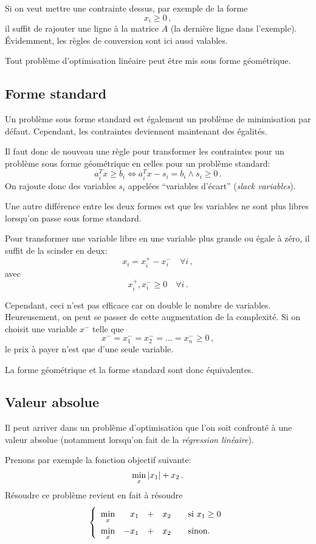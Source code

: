 	Si on veut mettre une contrainte dessus, par exemple de la forme
	\[
	x_i \ge 0\,,
	\]
	il suffit de rajouter une ligne à la matrice $A$
	(la dernière ligne dans l'exemple).
	Évidemment, les règles de conversion sont ici aussi valables.

	Tout problème d'optimisation linéaire
	peut être mis sous forme géométrique.

\subsection{Forme standard}

	Un problème sous forme standard est également
	un problème de minimisation par défaut.
	Cependant, les contraintes deviennent maintenant des égalités.

	Il faut donc de nouveau une règle
	pour transformer les contraintes
	pour un problème sous forme géométrique
	en celles pour un problème standard:
	\[
	a_i^T x \ge b_i \iff a_i^T x - s_i = b_i \land s_i \ge 0\,.
	\]
	On rajoute donc des variables $s_i$ appelées
	``variables d'écart'' (\emph{slack variables}).

	Une autre différence entre les deux formes est
	que les variables ne sont plus libres
	lorsqu'on passe sous forme standard.

	Pour transformer une variable libre
	en une variable plus grande ou égale à zéro,
	il suffit de la scinder en deux:
	\[
	x_i = x_i^+ - x_i^- \quad \forall i\,,
	\]
	avec
	\[
	x_i^+, x_i^- \ge 0 \quad \forall i\,.
	\]

	Cependant, ceci n'est pas efficace
	car on double le nombre de variables.
	Heureusement, on peut se passer de cette augmentation de la complexité.
	Si on choisit une variable $x^-$ telle que
	\[
	x^- = x_1^- = x_2^- = \dots = x_n^- \ge 0\,,
	\]
	le prix à payer n'est que d'une seule variable.

	La forme géométrique et la forme standard sont donc équivalentes.

\subsection{Valeur absolue}

	Il peut arriver dans un problème d'optimisation
	que l'on soit confronté à une valeur absolue
	(notamment lorsqu'on fait de la \emph{régression linéaire}).

	Prenons par exemple la fonction objectif suivante:
	\[
	\min_x \left\lvert x_1\right\lvert + x_2\,.
	\]
	Résoudre ce problème revient en fait à résoudre
	\[
	\left\{
	\renewcommand{\arraystretch}{1.5}
	\begin{array}{c@{\quad} r c r@{\qquad} l}
		\min\limits_x & x_1 & + & x_2 & \textnormal{si } x_1 \ge 0\\
		\min\limits_x & -x_1 & + & x_2 & \textnormal{sinon.}
	\end{array}
	\right.
	\]

